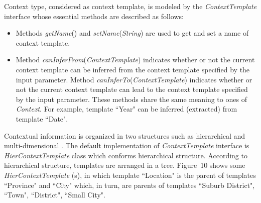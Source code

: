 \documentclass[a4paper]{llncs}
\begin{document}
Context type, considered as context template, is modeled by the \textit{ContextTemplate} interface whose essential methods are described as follows:
\begin{itemize}
\item Methods \textit{getName}() and \textit{setName}(\textit{String}) are used to get and set a name of context template.
\item Method \textit{canInferFrom}(\textit{ContextTemplate}) indicates whether or not the current context template can be inferred from the context template specified by the input parameter. Method \textit{canInferTo}(\textit{ContextTemplate}) indicates whether or not the current context template can lead to the context template specified by the input parameter. These methods share the same meaning to ones of \textit{Context}. For example, template ``Year" can be inferred (extracted) from template ``Date".
\end{itemize}
Contextual information is organized in two structures such as hierarchical and multi-dimensional \cite[pp. 225-228]{ricci2011}. The default implementation of \textit{ContextTemplate} interface is \textit{HierContextTemplate} class which conforms hierarchical structure. According to hierarchical structure, templates are arranged in a tree. Figure~10 shows some \textit{HierContextTemplate} (s), in which template ``Location" is the parent of templates ``Province" and ``City" which, in turn, are parents of templates ``Suburb District", ``Town", ``District", ``Small City".
\end{document}
